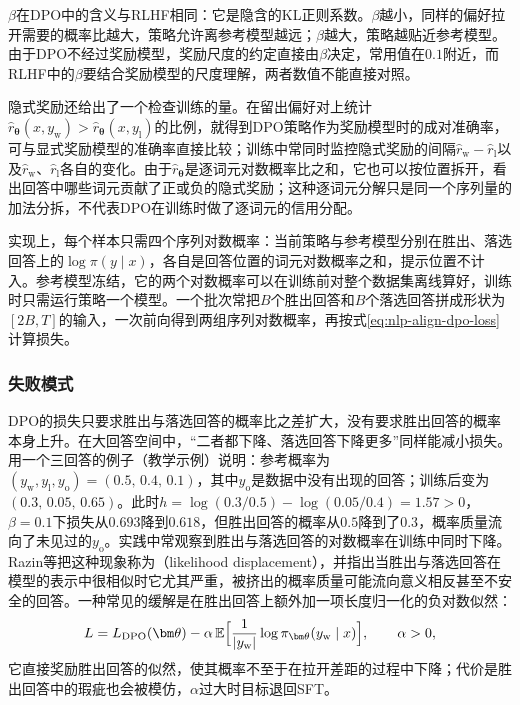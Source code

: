 $\beta$在DPO中的含义与RLHF相同：它是隐含的KL正则系数。$\beta$越小，同样的偏好拉开需要的概率比越大，策略允许离参考模型越远；$\beta$越大，策略越贴近参考模型。由于DPO不经过奖励模型，奖励尺度的约定直接由$\beta$决定，常用值在$0.1$附近，而RLHF中的$\beta$要结合奖励模型的尺度理解，两者数值不能直接对照。

隐式奖励还给出了一个检查训练的量。在留出偏好对上统计$\hat r_{\bm\theta}(x,y_{\mathrm w})>\hat r_{\bm\theta}(x,y_{\mathrm l})$的比例，就得到DPO策略作为奖励模型时的成对准确率，可与显式奖励模型的准确率直接比较；训练中常同时监控隐式奖励的间隔$\hat r_{\mathrm w}-\hat r_{\mathrm l}$以及$\hat r_{\mathrm w}$、$\hat r_{\mathrm l}$各自的变化。由于$\hat r_{\bm\theta}$是逐词元对数概率比之和，它也可以按位置拆开，看出回答中哪些词元贡献了正或负的隐式奖励；这种逐词元分解只是同一个序列量的加法分拆，不代表DPO在训练时做了逐词元的信用分配。

实现上，每个样本只需四个序列对数概率：当前策略与参考模型分别在胜出、落选回答上的$\log\pi(y\mid x)$，各自是回答位置的词元对数概率之和，提示位置不计入。参考模型冻结，它的两个对数概率可以在训练前对整个数据集离线算好，训练时只需运行策略一个模型。一个批次常把$B$个胜出回答和$B$个落选回答拼成形状为$[2B,T]$的输入，一次前向得到两组序列对数概率，再按式\eqref{eq:nlp-align-dpo-loss}计算损失。

\subsubsection{失败模式}
\label{sec:nlp-align-dpo-failure}

DPO的损失只要求胜出与落选回答的概率比之差扩大，没有要求胜出回答的概率本身上升。在大回答空间中，“二者都下降、落选回答下降更多”同样能减小损失。用一个三回答的例子（教学示例）说明：参考概率为$(y_{\mathrm w},y_{\mathrm l},y_{\mathrm o})=(0.5,\,0.4,\,0.1)$，其中$y_{\mathrm o}$是数据中没有出现的回答；训练后变为$(0.3,\,0.05,\,0.65)$。此时$h=\log(0.3/0.5)-\log(0.05/0.4)=1.57>0$，$\beta=0.1$下损失从$0.693$降到$0.618$，但胜出回答的概率从$0.5$降到了$0.3$，概率质量流向了未见过的$y_{\mathrm o}$。实践中常观察到胜出与落选回答的对数概率在训练中同时下降。Razin等把这种现象称为（likelihood displacement），并指出当胜出与落选回答在模型的表示中很相似时它尤其严重，被挤出的概率质量可能流向意义相反甚至不安全的回答。一种常见的缓解是在胜出回答上额外加一项长度归一化的负对数似然：
\[
 L=L_{\mathrm{DPO}}(\bm\theta)-\alpha\,\mathbb E\Bigl[\frac{1}{|y_{\mathrm w}|}\log\pi_{\bm\theta}(y_{\mathrm w}\mid x)\Bigr],\qquad\alpha>0,
\]
它直接奖励胜出回答的似然，使其概率不至于在拉开差距的过程中下降；代价是胜出回答中的瑕疵也会被模仿，$\alpha$过大时目标退回SFT。

